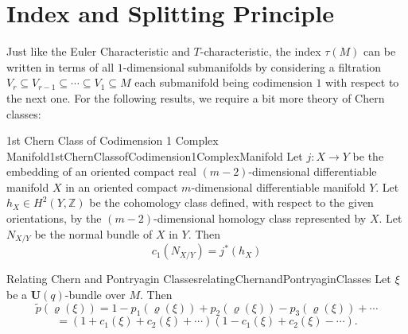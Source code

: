 \documentclass{book}
\newenvironment{Proof}[1][]
  {\begin{ProofTcb}[#1]}
  {\end{ProofTcb}}
\newcommand{\sse}{\subseteq}
\renewcommand{\bf}[1]{\textbf{#1}}
\begin{document}
\section{Index and Splitting Principle}


Just like the Euler Characteristic and $T$-characteristic, the index $\tau(M)$ can be written in terms of all
$1$-dimensional submanifolds by considering a filtration $V_r \sse V_{r-1} \sse \cdots \sse V_1 \sse M$ each submanifold
being codimension $1$ with respect to the next one. For the following results, we require a bit more theory of
Chern classes:

\begin{thm}{1st Chern Class of Codimension 1 Complex Manifold}{1stChernClassofCodimension1ComplexManifold}
Let $j: X \to Y$ be the embedding of an oriented compact real $(m-2)$-dimensional differentiable manifold $X$ in an
oriented compact $m$-dimensional differentiable manifold $Y$. Let $h_X \in H^2(Y,\mathbb{Z})$ be the cohomology
class defined, with respect to the given orientations, by the $(m-2)$-dimensional homology class represented
by $X$. Let $N_{X/Y}$ be the normal bundle of $X$ in $Y$. Then
\[
  c_1(N_{X/Y}) = j^*(h_X)
\]
\end{thm}

\begin{Proof}
  \cite[theorem 4.8.1]{hirzebruchTopologicalMethodsAlgebraic1995}
\end{Proof}

\begin{thm}{Relating Chern and Pontryagin Classes}{relatingChernandPontryaginClasses}
Let $\xi$ be a $\mathbf{U}(q)$-bundle over $M$. Then
\[
    \tilde{p}(\varrho(\xi)) = 1 - p_1(\varrho(\xi)) + p_2(\varrho(\xi)) - p_3(\varrho(\xi)) + \cdots
\]
\[
    = (1 + c_1(\xi) + c_2(\xi) + \cdots)(1 - c_1(\xi) + c_2(\xi) - \cdots).
\]
\end{thm}

\begin{Proof}
  \cite[theorem~4.5.1]{hirzebruchTopologicalMethodsAlgebraic1995}
\end{Proof}
\end{document}

